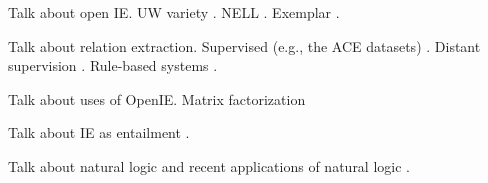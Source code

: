 Talk about open IE.
UW variety \cite{key:2007yates-textrunner,key:2011fader-reverb,key:2012mausam-ollie}.
NELL \cite{key:2010carlson-nell}.
Exemplar \cite{key:2013mesquita-exemplar}.

Talk about relation extraction.
Supervised (e.g., the ACE datasets)
  \cite{key:2004doddington-ace,key:2005zhou-ace,key:2007surdeanu-ace}.
Distant supervision 
  \cite{key:1999craven-distsup,key:2007wu-distsup,key:2009mintz-distsup,key:2011sun-kbp}.
Rule-based systems
  \cite{key:1997soderland-kbp,key:2010grishman-kbp,key:2010chen-kbp}.

Talk about uses of OpenIE.
Matrix factorization \cite{key:2012yao-schemas,key:2013riedel-schemas}

Talk about IE as entailment \cite{key:2006romano-ie}.

Talk about natural logic
  \cite{key:2008vanbenthem-natlog,key:2014icard-natlog}
and recent applications of natural logic
  \cite{key:2009maccartney-natlog,key:2013bowman-natlog,key:2013angeli-truth}.
